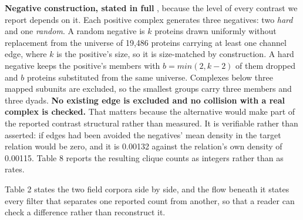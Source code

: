 \documentclass[twoside,11pt]{article}
\begin{document}
\textbf{Negative construction, stated in full} \citep{poursafaei}, because the level of every contrast we report depends on it. Each positive complex generates three negatives: two \emph{hard} and one \emph{random}. A random negative is \(k\) proteins drawn uniformly without replacement from the universe of 19,486 proteins carrying at least one channel edge, where \(k\) is the positive's size, so it is size-matched by construction. A hard negative keeps the positive's members with \(b = min(2,k - 2)\) of them dropped and \(b\) proteins substituted from the same universe. Complexes below three mapped subunits are excluded, so the smallest groups carry three members and three dyads. \textbf{No existing edge is excluded and no collision with a real complex is checked.} That matters because the alternative would make part of the reported contrast structural rather than measured. It is verifiable rather than asserted: if edges had been avoided the negatives' mean density in the target relation would be zero, and it is 0.00132 against the relation's own density of 0.00115. Table 8 reports the resulting clique counts as integers rather than as rates.

Table 2 states the two field corpora side by side, and the flow beneath it states every filter that separates one reported count from another, so that a reader can check a difference rather than reconstruct it.
\end{document}
